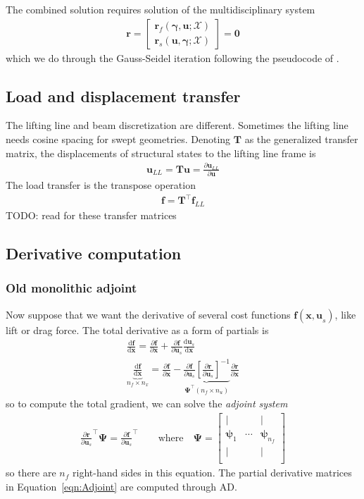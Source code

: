 \documentclass[10pt]{article}
\newcommand{\pp}[2]{\frac{\partial #1}{\partial #2}}
\newcommand{\dd}[2]{\frac{\textrm{d} #1}{\textrm{d} #2}}
\newcommand{\mb}[1]{\boldsymbol{\mathbf{#1}}} %
\newcommand{\mbf}[1]{\mathbf{#1}}
\newcommand{\mbs}[1]{\boldsymbol{#1}}
\newcommand{\mcal}[1]{\mathcal{#1}} %
\newcommand{\be}{\begin{eqnarray}}
\newcommand{\ee}{\end{eqnarray}}
\newcommand{\beq}{\begin{equation}\begin{aligned}}
\newcommand{\eeq}{\end{aligned}\end{equation}}
\newcommand{\tn}[1]{\textrm{#1}}
\begin{document}
The combined solution requires solution of the multidisciplinary system
\beq
\mbf{r} = \begin{bmatrix}
	\mbf{r}_f(\mbs{\gamma}, \mbf{u}; \mcal{X}) \\
	\mbf{r}_s(\mbf{u}, \mbs{\gamma}; \mcal{X})
\end{bmatrix}
=
\mbf{0}
\eeq
which we do through the Gauss-Seidel iteration following the pseudocode of \citet{Kenway2014a}.

\subsection{Load and displacement transfer}

The lifting line and beam discretization are different.
Sometimes the lifting line needs cosine spacing for swept geometries.
Denoting $\mb{T}$ as the generalized transfer matrix, the displacements of structural states to the lifting line frame is
\beq
\mb{u}_{LL} = \mb{T} \mb{u} = \pp{\mb{u}_{LL}}{\mb{u}}
\eeq
The load transfer is the transpose operation
\beq
\mb{f} = \mb{T}^\top \mb{f}_{LL}
\eeq
TODO: read \citet{Kenway2014a} for these transfer matrices

\subsection{Derivative computation}
% 
\subsubsection{Old monolithic adjoint}
% 
Now suppose that we want the derivative of several cost functions $\mbf{f}(\mbf{x,u}_s)$, like lift or drag force.
The total derivative as a form of partials \cite[Sec. 6.7.2]{Martins2022} is
\be
\dd{\mbf{f}}{\mbf{x}} =
\pp{\mbf{f}}{\mbf{x}} + \pp{\mbf{f}}{\mbf{u}_s} \dd{\mbf{u}_s}{\mbf{x}}
\\
\label{eqn:Adjoint}
\boxed{
	\underbrace{
		\dd{ \mbf{f}}{\mbf{x}}
	}_{n_f \times n_x}
	= \pp{\mbf{f}}{\mbf{x}}
	-
	\underbrace{\pp{\mbf{f}}{\mbf{u}_s} \left[\pp{\mbf{r}}{\mbf{u}_s}\right]^{-1}
	}_{\boldsymbol{\Psi^\top} (n_f \times n_u)}
	\pp{\mbf{r}}{\mbf{x}}
}
\ee
so to compute the total gradient, we can solve the \emph{adjoint system}
\be
\pp{\mbf{r}}{\mbf{u}_s}^\top \boldsymbol{\Psi}
=
\pp{\mbf{f}}{\mbf{u}_s}^\top
\qquad
\tn{where}
\quad
\boldsymbol{\Psi} = \begin{bmatrix}
	|                   &        & |                       \\
	\boldsymbol{\psi}_1 & \cdots & \boldsymbol{\psi}_{n_f} \\
	|                   &        & |                       \\
\end{bmatrix}
\ee
so there are $n_f$ right-hand sides in this equation.
The partial derivative matrices in Equation~\eqref{eqn:Adjoint} are computed through \ac{AD}.
\end{document}
